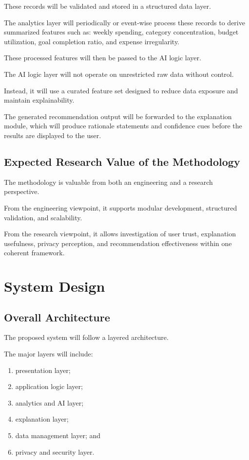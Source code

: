 \documentclass[12pt,a4paper]{report}
\begin{document}
These records will be validated and stored in a structured data layer.

The analytics layer will periodically or event-wise process these records to derive summarized features such as:
weekly spending,
category concentration,
budget utilization,
goal completion ratio,
and expense irregularity.

These processed features will then be passed to the AI logic layer.

The AI logic layer will not operate on unrestricted raw data without control.

Instead,
it will use a curated feature set designed to reduce data exposure and maintain explainability.

The generated recommendation output will be forwarded to the explanation module,
which will produce rationale statements and confidence cues before the results are displayed to the user.

\section{Expected Research Value of the Methodology}
The methodology is valuable from both an engineering and a research perspective.

From the engineering viewpoint,
it supports modular development,
structured validation,
and scalability.

From the research viewpoint,
it allows investigation of user trust,
explanation usefulness,
privacy perception,
and recommendation effectiveness within one coherent framework.

\chapter{System Design}

\section{Overall Architecture}
The proposed system will follow a layered architecture.

The major layers will include:
\begin{enumerate}[label=\arabic*.]
\item presentation layer;
\item application logic layer;
\item analytics and AI layer;
\item explanation layer;
\item data management layer;
and
\item privacy and security layer.
\end{enumerate}
\end{document}

